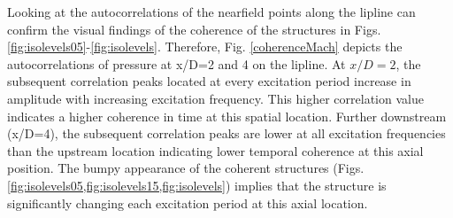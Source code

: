 \documentclass[english]{aiaa-tc}
\begin{document}
Looking at the autocorrelations of the nearfield points along the lipline can confirm the visual findings of the coherence of the structures in Figs. \ref{fig:isolevels05}-\ref{fig:isolevels}. 
Therefore, Fig. \ref{coherenceMach} depicts the autocorrelations of pressure at x/D=2 and 4 on the lipline. 
At $x/D=2$, the subsequent correlation peaks located at every excitation period increase in amplitude with increasing excitation frequency. This higher correlation value indicates a higher coherence in time at this spatial location. 
Further downstream (x/D=4), the subsequent correlation peaks are lower at all excitation frequencies than the upstream location indicating lower temporal coherence at this axial position. 
The bumpy appearance of the coherent structures (Figs. \ref{fig:isolevels05,fig:isolevels15,fig:isolevels}) implies that the structure is significantly changing each excitation period at this axial location. 
\end{document}
